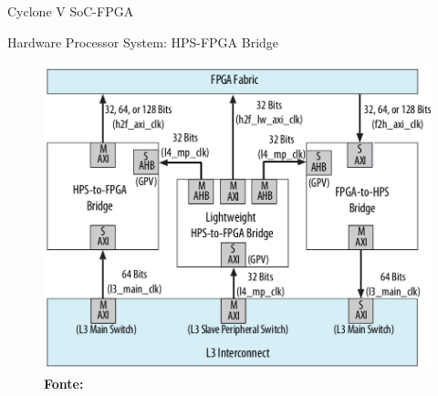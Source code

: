 \documentclass[10pt]{beamer}
\begin{document}
\begin{frame}{Cyclone V SoC-FPGA}
	\begin{alertblock}{Hardware Processor System: HPS-FPGA Bridge}
		\begin{figure}[h]
			\begin{center}
				\includegraphics[scale=0.21]{imagens/hps-fpga_bridge.png}\\
				{\footnotesize \textbf{Fonte:}}
			\end{center}
			\label{fig:bridge}
		\end{figure}
	\end{alertblock}
\end{frame}
\end{document}
